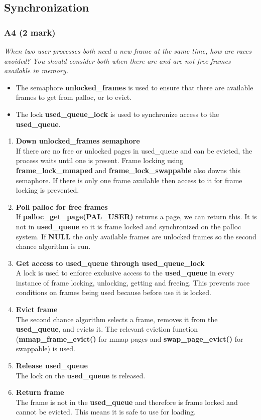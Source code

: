 \documentclass{report}
\newcommand{\question}[1]{\textit{#1} \ }
\newcommand{\bullpara}[2]{\item \textbf{#1} \ #2}
\newcommand{\fun}[1]{\textcolor{Emerald}{\textbf{#1}}}
\newcommand{\var}[1]{\textcolor{RoyalPurple}{\textbf{#1}}}
\newcommand{\const}[1]{\textcolor{BrickRed}{\textbf{#1}}}
\newcommand{\compitem}[1]{\begin{itemize}\setlength\itemsep{-0.5em}#1\end{itemize}}
\newcommand{\compenum}[1]{\begin{enumerate}\setlength\itemsep{-0.5em}#1\end{enumerate}}
\begin{document}
		\subsection*{Synchronization}
			\subsubsection*{A4 (2 mark)}
				\question{When two user processes both need a new frame at 
				the same time, how are races avoided? You should consider both 
				when there are and are not free frames available in memory.}
				
				\compitem{
					\item The semaphore \var{unlocked\_frames} is used 
					to ensure that there are available frames to get from 
					palloc, or to evict.
					\item The lock \var{used\_queue\_lock} is used to 
					synchronize access to the \var{used\_queue}.
				}
				\compenum {
					\bullpara{Down \var{unlocked\_frames} semaphore}{
						\\ If there are no free or unlocked pages in used\_queue
						and can be evicted, the process waits until one is present. 
						Frame locking using \fun{frame\_lock\_mmaped} and 
						\fun{frame\_lock\_swappable} also downs this semaphore.
						If there is only one frame available then access to it
						for frame locking is prevented.
					}
					\bullpara{Poll palloc for free frames}{
						\\ If \fun{palloc\_get\_page(\const{PAL\_USER})} returns
						a page, we can return this. It is not in 
						\var{used\_queue} so it is frame locked and 
						synchronized on the palloc system. If \const{NULL} the 
						only available frames are unlocked frames so the second 
						chance algorithm is run.
					}
					\bullpara{Get access to \var{used\_queue} through \var{used\_queue\_lock}}{
						\\ A lock is used to enforce exclusive access to the 
						\var{used\_queue} in every instance of frame locking,
						unlocking, getting and freeing. This prevents race 
						conditions on frames being used because before
						use it is locked.
					} 
					\bullpara{Evict frame}{
						\\ The second chance algorithm selects a frame,
						removes it from the \var{used\_queue}, and evicts it.
						The relevant eviction function (\fun{mmap\_frame\_evict()} 
						for mmap pages and \fun{swap\_page\_evict()} for swappable)
						is used.
					}
					\bullpara{Release \var{used\_queue}}{
						\\ The lock on the \var{used\_queue} is released.
					}
					\bullpara{Return frame}{
						\\ The frame is not in the \var{used\_queue} and therefore
						is frame locked and cannot be evicted.
						This means it is safe to use for loading.
					}
				}
\end{document}
